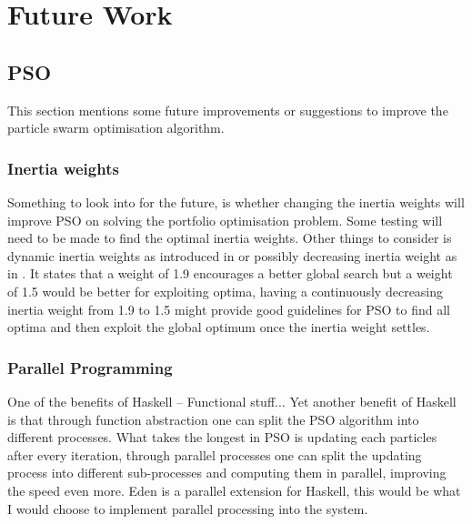 \chapter{Future Work}

  \section{PSO} %
  \label{sec:pso}
  This section mentions some future improvements or suggestions to improve the particle swarm optimisation algorithm.
    \subsection{Inertia weights} %
    \label{sub:inertia_weights2}
      Something to look into for the future, is whether changing the inertia weights will improve PSO on solving the portfolio optimisation problem. Some testing will need to be made to find the optimal inertia weights. Other things to consider is dynamic inertia weights as introduced in \cite{dynamic_inertia} or possibly decreasing inertia weight as in \cite{inertia}. It states that a weight of 1.9 encourages a better global search but a weight of 1.5 would be better for exploiting optima, having a continuously decreasing inertia weight from 1.9 to 1.5 might provide good guidelines for PSO to find all optima and then exploit the global optimum once the inertia weight settles. 
    \subsection{Parallel Programming} %
    \label{sub:parallel_programming}
      One of the benefits of Haskell -- Functional stuff...
      Yet another benefit of Haskell is that through function abstraction \cite{haskellPSO} one can split the PSO algorithm into different processes. What takes the longest in PSO is updating each particles after every iteration, through parallel processes one can split the updating process into different sub-processes and computing them in parallel, improving the speed even more. Eden \cite{eden,eden2} is a parallel extension for Haskell, this would be what I would choose to implement parallel processing into the system.
